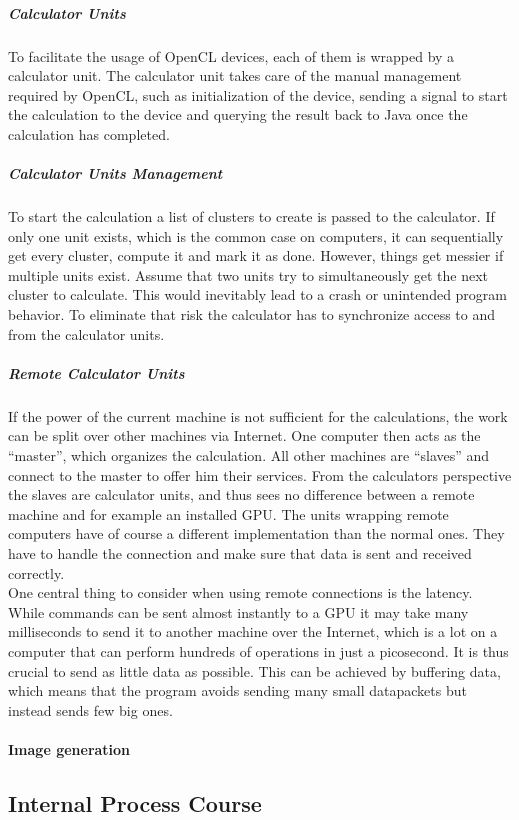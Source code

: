 \documentclass[10pt,a4paper,titlepage]{article}
\begin{document}
	\subparagraph{Calculator Units}
	To facilitate the usage of OpenCL devices, each of them is wrapped by a calculator unit. The calculator unit takes care of the manual management required by OpenCL, such as initialization of the device, sending a signal to start the calculation to the device and querying the result back to Java once the calculation has completed.
	\subparagraph{Calculator Units Management}
	To start the calculation a list of clusters to create is passed to the calculator. If only one unit exists, which is the common case on computers, it can sequentially get every cluster, compute it and mark it as done. However, things get messier if multiple units exist. Assume that two units try to simultaneously get the next cluster to calculate. This would inevitably lead to a crash or unintended program behavior. To eliminate that risk the calculator has to synchronize access to and from the calculator units.
	\subparagraph{Remote Calculator Units}
	If the power of the current machine is not sufficient for the calculations, the work can be split over other machines via Internet. One computer then acts as the ``master'', which organizes the calculation. All other machines are ``slaves'' and connect to the master to offer him their services. From the calculators perspective the slaves are calculator units, and thus sees no difference between a remote machine and for example an installed GPU. The units wrapping remote computers have of course a different implementation than the normal ones. They have to handle the connection and make sure that data is sent and received correctly.\\
	One central thing to consider when using remote connections is the latency. While commands can be sent almost instantly to a GPU it may take many milliseconds to send it to another machine over the Internet, which is a lot on a computer that can perform hundreds of operations in just a picosecond. It is thus crucial to send as little data as possible. This can be achieved by buffering data, which means that the program avoids sending many small datapackets but instead sends few big ones.
	\paragraph{Image generation}\label{sec:image_generation}
	
	\subsection{Internal Process Course}
\end{document}
